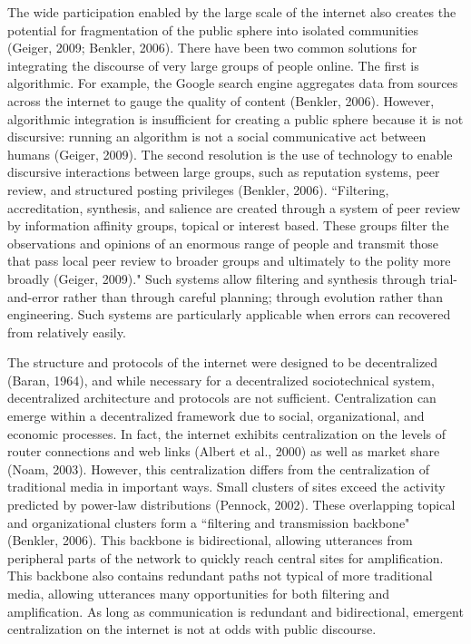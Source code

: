 The wide participation enabled by the large scale of the internet also creates the potential for fragmentation of the public sphere into isolated communities (Geiger, 2009; Benkler, 2006). There have been two common solutions for integrating the discourse of very large groups of people online. The first is algorithmic. For example, the Google search engine aggregates data from sources across the internet to gauge the quality of content (Benkler, 2006). However, algorithmic integration is insufficient for creating a public sphere because it is not discursive: running an algorithm is not a social communicative act between humans (Geiger, 2009). The second resolution is the use of technology to enable discursive interactions between large groups, such as reputation systems, peer review, and structured posting privileges (Benkler, 2006). ``Filtering, accreditation, synthesis, and salience are created through a system of peer review by information affinity groups, topical or interest based. These groups filter the observations and opinions of an enormous range of people and transmit those that pass local peer review to broader groups and ultimately to the polity more broadly (Geiger, 2009)." Such systems allow filtering and synthesis through trial-and-error rather than through careful planning; through evolution rather than engineering. Such systems are particularly applicable when errors can recovered from relatively easily.

The structure and protocols of the internet were designed to be decentralized (Baran, 1964), and while necessary for a decentralized sociotechnical system, decentralized architecture and protocols are not sufficient. Centralization can emerge within a decentralized framework due to social, organizational, and economic processes. In fact, the internet exhibits centralization on the levels of router connections and web links (Albert et al., 2000) as well as market share (Noam, 2003). However, this centralization differs from the centralization of traditional media in important ways. Small clusters of sites exceed the activity predicted by power-law distributions (Pennock, 2002). These overlapping topical and organizational clusters form a ``filtering and transmission backbone" (Benkler, 2006). This backbone is bidirectional, allowing utterances from peripheral parts of the network to quickly reach central sites for amplification. This backbone also contains redundant paths not typical of more traditional media, allowing utterances many opportunities for both filtering and amplification. As long as communication is redundant and bidirectional, emergent centralization on the internet is not at odds with public discourse.

